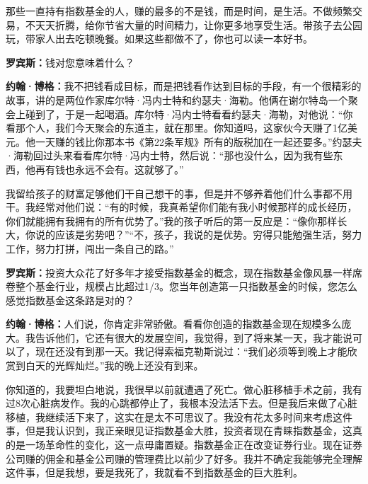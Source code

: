 那些一直持有指数基金的人，赚的最多的不是钱，而是时间，是生活。不做频繁交易，不天天折腾，给你节省大量的时间精力，让你更多地享受生活。带孩子去公园玩，带家人出去吃顿晚餐。如果这些都做不了，你也可以读一本好书。

\begin{BookQuote}
\textbf{罗宾斯：}钱对您意味着什么？
\end{BookQuote}

\begin{BookQuote}
\textbf{约翰·博格：}我不把钱看成目标，而是把钱看作达到目标的手段，有一个很精彩的故事，讲的是两位作家库尔特·冯内士特和约瑟夫·海勒。他俩在谢尔特岛一个聚会上碰到了，于是一起喝酒。库尔特·冯内士特看看约瑟夫·海勒，对他说：“你看那个人，我们今天聚会的东道主，就在那里。你知道吗，这家伙今天赚了1亿美元。他一天赚的钱比你那本书《第22条军规》所有的版税加在一起还要多。”约瑟夫·海勒回过头来看看库尔特·冯内士特，然后说：“那也没什么，因为我有些东西，他再有钱也永远不会有。这就够了。”
\end{BookQuote}

我留给孩子的财富足够他们干自己想干的事，但是并不够养着他们什么事都不用干。我经常对他们说：“有的时候，我真希望你们能有我小时候那样的成长经历，你们就能拥有我拥有的所有优势了。”我的孩子听后的第一反应是：“像你那样长大，你说的应该是劣势吧？”“不，孩子，我说的是优势。穷得只能勉强生活，努力工作，努力打拼，闯出一条自己的路。”

\begin{BookQuote}
\textbf{罗宾斯：}投资大众花了好多年才接受指数基金的概念，现在指数基金像风暴一样席卷整个基金行业，规模占比超过1/3。您当年创造第一只指数基金的时候，您怎么感觉指数基金这条路是对的？
\end{BookQuote}

\begin{BookQuote}
\textbf{约翰·博格：}人们说，你肯定非常骄傲。看看你创造的指数基金现在规模多么庞大。我告诉他们，它还有很大的发展空间，我觉得，到了将来某一天，我才能说可以了，现在还没有到那一天。我记得索福克勒斯说过：“我们必须等到晚上才能欣赏到白天的光辉灿烂。”我的晚上还没有到来。
\end{BookQuote}

你知道的，我要坦白地说，我很早以前就遭遇了死亡。做心脏移植手术之前，我有过8次心脏病发作。我的心跳都停止了，我根本没法活下去。但是我后来做了心脏移植，我继续活下来了，这实在是太不可思议了。我没有花太多时间来考虑这件事，但是我认识到，我正亲眼见证指数基金大胜，投资者现在青睐指数基金，这真的是一场革命性的变化，这一点毋庸置疑。指数基金正在改变证券行业。现在证券公司赚的佣金和基金公司赚的管理费比以前少了好多。我并不确定我能够完全理解这件事，但是我想，要是我死了，我就看不到指数基金的巨大胜利。


